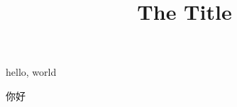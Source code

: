 \documentclass[UTF8]{article}
\title{The Title}
\begin{document}
\maketitle
hello, world %

你好
\end{document}
